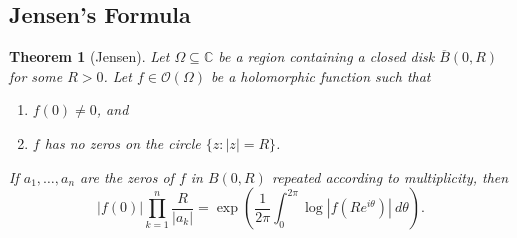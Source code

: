 \documentclass[11pt]{article}
\theoremstyle{thmstyle}
\newtheorem{theorem}{Theorem}[section]
\theoremstyle{defstyle}
\newcommand{\bbC}{\mathbb{C}}
\newcommand{\scrO}{\mathscr{O}} %
\begin{document}
\subsection{Jensen's Formula}

\begin{theorem}[Jensen]
    Let $\Omega\subseteq\bbC$ be a region containing a closed disk $\overline B(0, R)$ for some $R > 0$. Let $f\in\scrO(\Omega)$ be a holomorphic function such that 
    \begin{enumerate}[label=(\roman*)]
        \item $f(0)\ne 0$, and 
        \item $f$ has no zeros on the circle $\{z\colon |z| = R\}$.
    \end{enumerate}
    If $a_1,\dots, a_n$ are the zeros of $f$ in $B(0, R)$ repeated according to multiplicity, then 
    \begin{equation*}
        |f(0)|\prod_{k = 1}^n\frac{R}{|a_k|} = \exp\left(\frac{1}{2\pi}\int_0^{2\pi}\log|f(Re^{i\theta})|~d\theta\right).
    \end{equation*}
\end{theorem}
\end{document}
